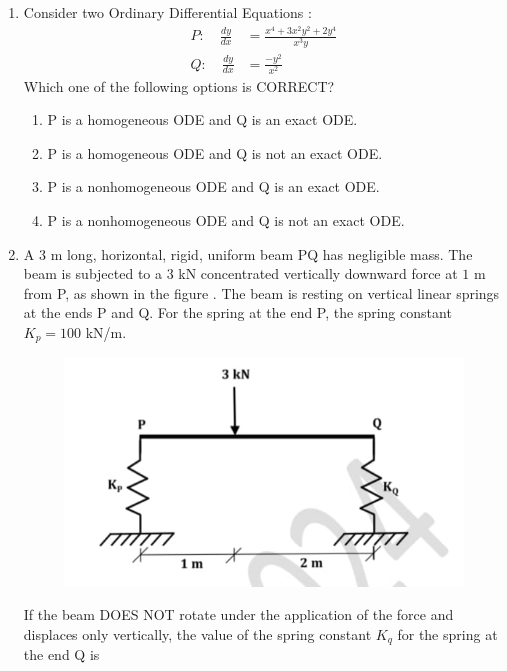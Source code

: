 \documentclass[journal,12pt,onecolumn]{article}
\theoremstyle{remark}
\begin{document}
\begin{enumerate}
    \item Consider two Ordinary Differential Equations :
    \begin{align}
    P\colon \quad \frac{dy}{dx} &= \frac{x^4+3x^2y^2+2y^4}{x^3y} \\
    Q\colon \quad \frac{dy}{dx} &= \frac{-y^2}{x^2}
    \end{align}
    Which one of the following options is CORRECT?
    
    \hfill{}
    \begin{enumerate}
        \item P is a homogeneous ODE and Q is an exact ODE.
        \item P is a homogeneous ODE and Q is not an exact ODE.
        \item P is a nonhomogeneous ODE and Q is an exact ODE.
        \item P is a nonhomogeneous ODE and Q is not an exact ODE.
    \end{enumerate}

    \item A $3$ m long, horizontal, rigid, uniform beam PQ has negligible mass. The beam is
    subjected to a $3$ kN concentrated vertically downward force at $1$ m from P, as shown in the figure . The beam is resting on vertical linear springs at the ends P and Q. For
    the spring at the end P, the spring constant $K_p = 100$ kN/m.
    \begin{figure}[H]
        \centering
        \includegraphics[width=0.7\columnwidth]{figs/2Q16.jpg}
        \caption{}
        \label{fig:q16}
    \end{figure}
    If the beam DOES NOT rotate under the application of the force and displaces only
    vertically, the value of the spring constant $K_q$  for the spring at the end Q is
    
    \hfill{}
    \begin{enumerate}
    \end{enumerate}


\end{enumerate}
\end{document}
